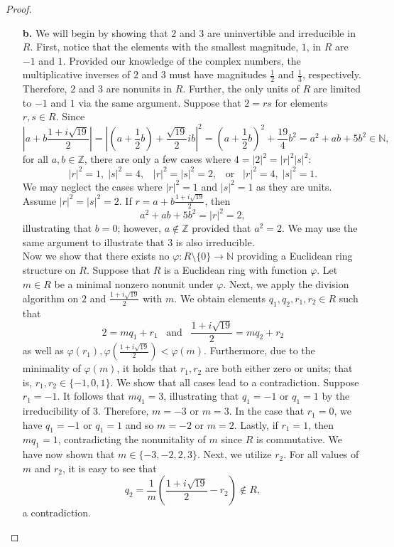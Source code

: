 \documentclass[ 12pt ]{article}
\begin{document}
\begin{enumerate}
\begin{proof}
\begin{enumerate}
				\item[\textbf{b.}] We will begin by showing that $2$ and $3$ are uninvertible and irreducible in $R$. First, notice that the elements with the smallest magnitude, $1$, in $R$ are $-1$ and $1$. Provided our knowledge of the complex numbers, the multiplicative inverses of $2$ and $3$ must have magnitudes $\frac{1}{2}$ and $\frac{1}{3}$, respectively. Therefore, $2$ and $3$ are nonunits in $R$. Further, the only units of $R$ are limited to $-1$ and $1$ via the same argument. Suppose that $2 = rs$ for elements $r, s \in R$. Since $$\left | a + b \frac{1 + i\sqrt{19}}{2} \right | = \left | \left(a + \frac{1}{2} b\right) + \frac{\sqrt{19}}{2} ib \right |^2 = \left(a + \frac{1}{2} b\right)^2 + \frac{19}{4} b^2 = a^2 + ab + 5b^2 \in \mathbb{N},$$ for all $a, b \in \mathbb{Z}$, there are only a few cases where $4 = |2|^2 = |r|^2 |s|^2$: $$|r|^2 = 1,\; |s|^2 = 4,\;\;\; |r|^2 = |s|^2 = 2,\;\;\; \mathrm{or}\;\;\; |r|^2 = 4,\; |s|^2 = 1.$$ We may neglect the cases where $|r|^2 = 1$ and $|s|^2 = 1$ as they are units. Assume $|r|^2 = |s|^2 = 2$. If $r = a + b \frac{1 + i\sqrt{19}}{2}$, then $$a^2 + ab + 5b^2 = |r|^2 = 2,$$ illustrating that $b = 0$; however, $a \notin \mathbb{Z}$ provided that $a^2 = 2$. We may use the same argument to illustrate that $3$ is also irreducible. \\

				Now we show that there exists no $\varphi : R \setminus \{ 0 \} \to \mathbb{N}$ providing a Euclidean ring structure on $R$. Suppose that $R$ is a Euclidean ring with function $\varphi$. Let $m \in R$ be a minimal nonzero nonunit under $\varphi$. Next, we apply the division algorithm on $2$ and $\frac{1 + i\sqrt{19}}{2}$ with $m$. We obtain elements $q_1, q_2, r_1, r_2 \in R$ such that $$2 = mq_1 + r_1\;\;\; \mathrm{and}\;\;\; \frac{1 + i\sqrt{19}}{2} = mq_2 + r_2$$ as well as $\varphi(r_1), \varphi \left ( \frac{1 + i\sqrt{19}}{2} \right ) < \varphi(m)$. Furthermore, due to the minimality of $\varphi(m)$, it holds that $r_1, r_2$ are both either zero or units; that is, $r_1, r_2 \in \{ -1, 0, 1 \}$. We show that all cases lead to a contradiction. Suppose $r_1 = -1$. It follows that $mq_1 = 3$, illustrating that $q_1 = -1$ or $q_1 = 1$ by the irreducibility of $3$. Therefore, $m = -3$ or $m = 3$. In the case that $r_1 = 0$, we have $q_1 = -1$ or $q_1 = 1$ and so $m = -2$ or $m = 2$. Lastly, if $r_1 = 1$, then $mq_1 = 1$, contradicting the nonunitality of $m$ since $R$ is commutative. We have now shown that $m \in \{ -3, -2, 2, 3 \}$. Next, we utilize $r_2$. For all values of $m$ and $r_2$, it is easy to see that $$q_2 = \frac{1}{m} \left ( \frac{1 + i\sqrt{19}}{2} - r_2 \right ) \notin R,$$ a contradiction.
			\end{enumerate}
		\end{proof}



\end{enumerate}
\end{document}
